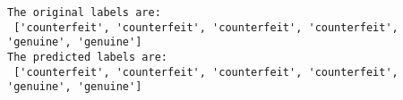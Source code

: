 \documentclass[11pt]{article}
\begin{document}
    \begin{Verbatim}[commandchars=\\\{\}]
The original labels are:
 ['counterfeit', 'counterfeit', 'counterfeit', 'counterfeit', 'genuine', 'genuine']
The predicted labels are:
 ['counterfeit', 'counterfeit', 'counterfeit', 'counterfeit', 'genuine', 'genuine']

    \end{Verbatim}


    
    
    
    
\end{document}
